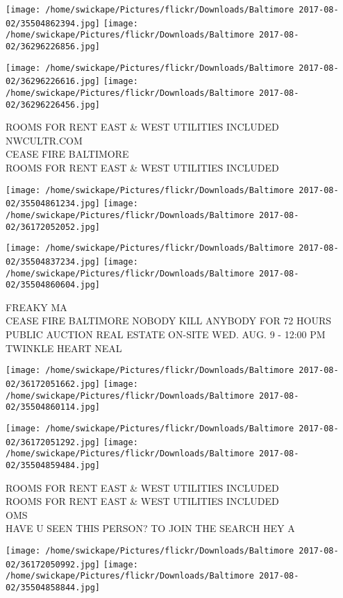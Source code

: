 \documentclass[10pt,letterpaper]{article}
\begin{document}
\texttt{[image: /home/swickape/Pictures/flickr/Downloads/Baltimore 2017-08-02/35504862394.jpg]}
\texttt{[image: /home/swickape/Pictures/flickr/Downloads/Baltimore 2017-08-02/36296226856.jpg]}

\texttt{[image: /home/swickape/Pictures/flickr/Downloads/Baltimore 2017-08-02/36296226616.jpg]}
\texttt{[image: /home/swickape/Pictures/flickr/Downloads/Baltimore 2017-08-02/36296226456.jpg]}

ROOMS FOR RENT EAST \& WEST UTILITIES INCLUDED\\
NWCULTR.COM\\
CEASE FIRE BALTIMORE\\
ROOMS FOR RENT EAST \& WEST UTILITIES INCLUDED
\pagebreak

\texttt{[image: /home/swickape/Pictures/flickr/Downloads/Baltimore 2017-08-02/35504861234.jpg]}
\texttt{[image: /home/swickape/Pictures/flickr/Downloads/Baltimore 2017-08-02/36172052052.jpg]}

\texttt{[image: /home/swickape/Pictures/flickr/Downloads/Baltimore 2017-08-02/35504837234.jpg]}
\texttt{[image: /home/swickape/Pictures/flickr/Downloads/Baltimore 2017-08-02/35504860604.jpg]}

FREAKY MA\\
CEASE FIRE BALTIMORE NOBODY KILL ANYBODY FOR 72 HOURS\\
PUBLIC AUCTION REAL ESTATE ON{-}SITE WED. AUG. 9 {-} 12:00 PM\\
TWINKLE HEART NEAL
\pagebreak

\texttt{[image: /home/swickape/Pictures/flickr/Downloads/Baltimore 2017-08-02/36172051662.jpg]}
\texttt{[image: /home/swickape/Pictures/flickr/Downloads/Baltimore 2017-08-02/35504860114.jpg]}

\texttt{[image: /home/swickape/Pictures/flickr/Downloads/Baltimore 2017-08-02/36172051292.jpg]}
\texttt{[image: /home/swickape/Pictures/flickr/Downloads/Baltimore 2017-08-02/35504859484.jpg]}

ROOMS FOR RENT EAST \& WEST UTILITIES INCLUDED\\
ROOMS FOR RENT EAST \& WEST UTILITIES INCLUDED\\
OMS\\
HAVE U SEEN THIS PERSON?  TO JOIN THE SEARCH HEY A
\pagebreak

\texttt{[image: /home/swickape/Pictures/flickr/Downloads/Baltimore 2017-08-02/36172050992.jpg]}
\texttt{[image: /home/swickape/Pictures/flickr/Downloads/Baltimore 2017-08-02/35504858844.jpg]}
\end{document}
